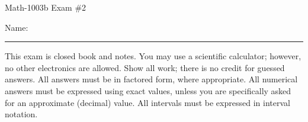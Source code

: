 \documentclass[letterpaper,12pt,fleqn]{article}
\begin{document}
\begin{center}
\Large Math-1003b Exam \#2
\end{center}

\vspace{0.5in}

Name: \rule{4in}{1pt}

\vspace{0.5in}

This exam is closed book and notes. You may use a scientific calculator; however, no
other electronics are allowed. Show all work; there is no credit for guessed answers. All
answers must be in factored form, where appropriate. All numerical answers must be
expressed using exact values, unless you are specifically asked for an approximate
(decimal) value. All intervals must be expressed in interval notation.

\vspace{0.25in}
\end{document}
